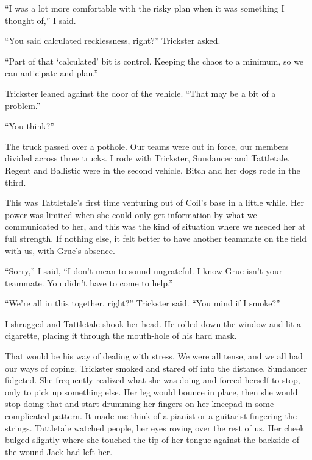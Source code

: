 





``I was a lot more comfortable with the risky plan when it was something I thought of,'' I said.



``You said calculated recklessness, right?''  Trickster asked.



``Part of that `calculated' bit is control.  Keeping the chaos to a minimum, so we can anticipate and plan.''



Trickster leaned against the door of the vehicle.  ``That may be a bit of a problem.''



``You think?''



The truck passed over a pothole.  Our teams were out in force, our members divided across three trucks.  I rode with Trickster, Sundancer and Tattletale.  Regent and Ballistic were in the second vehicle.  Bitch and her dogs rode in the third.



This was Tattletale's first time venturing out of Coil's base in a little while.  Her power was limited when she could only get information by what we communicated to her, and this was the kind of situation where we needed her at full strength.  If nothing else, it felt better to have another teammate on the field with us, with Grue's absence.



``Sorry,'' I said, ``I don't mean to sound ungrateful.  I know Grue isn't your teammate.  You didn't have to come to help.''



``We're all in this together, right?'' Trickster said.  ``You mind if I smoke?''



I shrugged and Tattletale shook her head.  He rolled down the window and lit a cigarette, placing it through the mouth-hole of his hard mask.



That would be his way of dealing with stress.  We were all tense, and we all had our ways of coping.  Trickster smoked and stared off into the distance.  Sundancer fidgeted.  She frequently realized what she was doing and forced herself to stop, only to pick up something else.  Her leg would bounce in place, then she would stop doing that and start drumming her fingers on her kneepad in some complicated pattern.  It made me think of a pianist or a guitarist fingering the strings.  Tattletale watched people, her eyes roving over the rest of us.  Her cheek bulged slightly where she touched the tip of her tongue against the backside of the wound Jack had left her.



